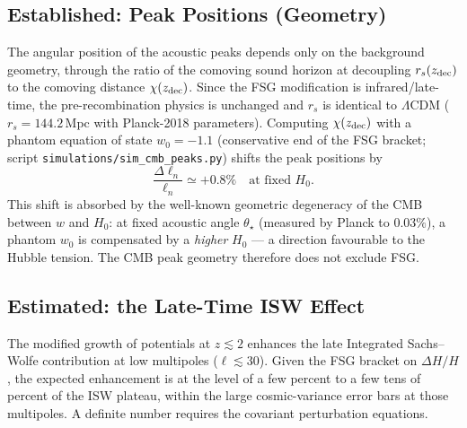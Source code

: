 \documentclass[11pt,a4paper]{article}
\begin{document}
\begin{onehalfspacing}
\subsection{Established: Peak Positions (Geometry)}
The angular position of the acoustic peaks depends only on the background geometry, through the ratio of the comoving sound horizon at decoupling $r_s(z_{\rm dec})$ to the comoving distance $\chi(z_{\rm dec})$. Since the FSG modification is infrared/late-time, the pre-recombination physics is unchanged and $r_s$ is identical to $\Lambda$CDM ($r_s = 144.2\,$Mpc with Planck-2018 parameters). Computing $\chi(z_{\rm dec})$ with a phantom equation of state $w_0 = -1.1$ (conservative end of the FSG bracket; script \texttt{simulations/sim\_cmb\_peaks.py}) shifts the peak positions by
\begin{equation}
\frac{\Delta \ell_n}{\ell_n} \simeq +0.8\% \quad \text{at fixed } H_0.
\end{equation}
This shift is absorbed by the well-known geometric degeneracy of the CMB between $w$ and $H_0$: at fixed acoustic angle $\theta_\star$ (measured by Planck to $0.03\%$), a phantom $w_0$ is compensated by a \emph{higher} $H_0$ --- a direction favourable to the Hubble tension. The CMB peak geometry therefore does not exclude FSG.
\subsection{Estimated: the Late-Time ISW Effect}
The modified growth of potentials at $z \lesssim 2$ enhances the late Integrated Sachs--Wolfe contribution at low multipoles ($\ell \lesssim 30$). Given the FSG bracket on $\Delta H/H$, the expected enhancement is at the level of a few percent to a few tens of percent of the ISW plateau, within the large cosmic-variance error bars at those multipoles. A definite number requires the covariant perturbation equations.

\end{onehalfspacing}
\end{document}
